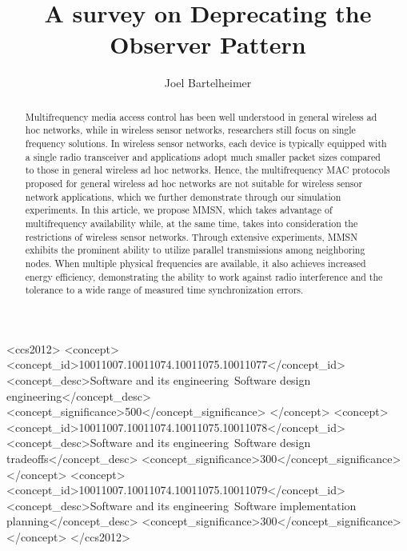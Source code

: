 \documentclass[acmtoc, authorversion]{acmart}
\begin{document}
\title{A survey on Deprecating the Observer Pattern}

\author{Joel Bartelheimer}


\renewcommand\shortauthors{Bartelheimer, J. }

\begin{abstract}
	Multifrequency media access control has been well understood in
	general wireless ad hoc networks, while in wireless sensor networks,
	researchers still focus on single frequency solutions. In wireless
	sensor networks, each device is typically equipped with a single
	radio transceiver and applications adopt much smaller packet sizes
	compared to those in general wireless ad hoc networks. Hence, the
	multifrequency MAC protocols proposed for general wireless ad hoc
	networks are not suitable for wireless sensor network applications,
	which we further demonstrate through our simulation experiments. In
	this article, we propose MMSN, which takes advantage of
	multifrequency availability while, at the same time, takes into
	consideration the restrictions of wireless sensor networks. Through
	extensive experiments, MMSN exhibits the prominent ability to utilize
	parallel transmissions among neighboring nodes. When multiple physical
	frequencies are available, it also achieves increased energy
	efficiency, demonstrating the ability to work against radio
	interference and the tolerance to a wide range of measured time
	synchronization errors.
\end{abstract}


%
%
\begin{CCSXML}
	<ccs2012>
	<concept>
	<concept_id>10011007.10011074.10011075.10011077</concept_id>
	<concept_desc>Software and its engineering~Software design engineering</concept_desc>
	<concept_significance>500</concept_significance>
	</concept>
	<concept>
	<concept_id>10011007.10011074.10011075.10011078</concept_id>
	<concept_desc>Software and its engineering~Software design tradeoffs</concept_desc>
	<concept_significance>300</concept_significance>
	</concept>
	<concept>
	<concept_id>10011007.10011074.10011075.10011079</concept_id>
	<concept_desc>Software and its engineering~Software implementation planning</concept_desc>
	<concept_significance>300</concept_significance>
	</concept>
	</ccs2012>
\end{CCSXML}
\end{document}

